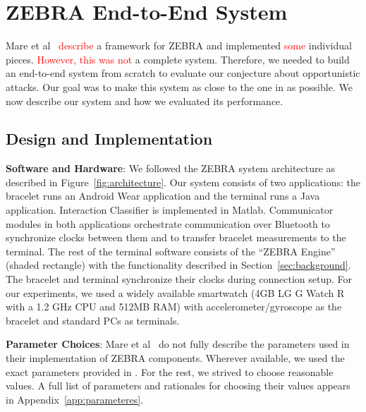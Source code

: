 \documentclass[conference]{IEEEtran}
\newcommand{\zebra}{ZEBRA\xspace}
\newcommand\changeMika[1]{\textcolor{red}{#1}}
\newcommand\changeMika[1]{{#1}}
\begin{document}
 
\section{\zebra End-to-End System}
\label{sec:system_setup}

Mare et al~\cite{mare2014zebra} \changeMika{describe} a framework for \zebra and implemented \changeMika{some} individual pieces. \changeMika{However, this was not} a complete system. Therefore, we needed to build an end-to-end system from scratch to evaluate our conjecture about opportunistic attacks. Our goal was to make this system as close to the one in \cite{mare2014zebra} as possible. We now describe our system and how we evaluated its performance.


\subsection{Design and Implementation}
\label{sec:system_design}


\noindent\textbf{Software and Hardware}: We followed the ZEBRA system architecture as described in Figure~\ref{fig:architecture}. Our system consists of two applications: the bracelet runs an Android Wear application and the terminal runs a Java application. Interaction Classifier is implemented in Matlab. Communicator modules in both applications orchestrate communication over Bluetooth to synchronize clocks between them and to transfer bracelet measurements to the terminal. The rest of the terminal software consists of the ``\zebra Engine'' (shaded rectangle) with the functionality described in Section~\ref{sec:background}. The bracelet and terminal synchronize their clocks during connection setup. For our experiments, we used a widely available smartwatch (4GB LG G Watch R with a 1.2 GHz CPU and 512MB RAM) with accelerometer/gyroscope as the bracelet and standard PCs as terminals. 










\vspace{1mm}
\noindent\textbf{Parameter Choices}: Mare et al~\cite{mare2014zebra} do not fully describe the parameters used in their implementation of \zebra components. Wherever available, we used the exact parameters provided in \cite{mare2014zebra} \cite{mare}. For the rest, we strived to choose reasonable values. A full list of parameters and rationales for choosing their values appears in Appendix~\ref{app:parameteres}.
\end{document}
